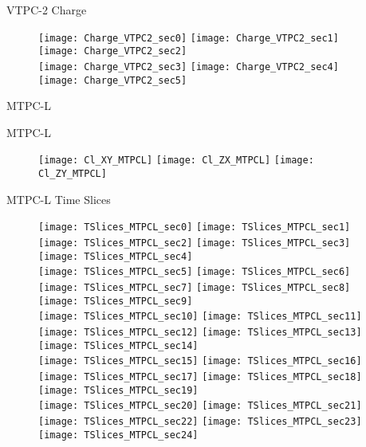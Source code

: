 \documentclass[11pt]{beamer}
\begin{document}
\begin{frame}{VTPC-2 Charge}
\begin{figure}
\centering
\texttt{[image: Charge\_VTPC2\_sec0]}
\texttt{[image: Charge\_VTPC2\_sec1]}
\texttt{[image: Charge\_VTPC2\_sec2]}\\
\texttt{[image: Charge\_VTPC2\_sec3]}
\texttt{[image: Charge\_VTPC2\_sec4]}
\texttt{[image: Charge\_VTPC2\_sec5]}
\end{figure}
\end{frame}

\begin{frame}
\centering
\Huge
MTPC-L
\end{frame}

\begin{frame}{MTPC-L}
\begin{figure}
\centering
\texttt{[image: Cl\_XY\_MTPCL]}
\texttt{[image: Cl\_ZX\_MTPCL]}
\texttt{[image: Cl\_ZY\_MTPCL]}
\end{figure}
\end{frame}

\begin{frame}{MTPC-L Time Slices}
\begin{figure}
\centering
\texttt{[image: TSlices\_MTPCL\_sec0]}
\texttt{[image: TSlices\_MTPCL\_sec1]}
\texttt{[image: TSlices\_MTPCL\_sec2]}
\texttt{[image: TSlices\_MTPCL\_sec3]}
\texttt{[image: TSlices\_MTPCL\_sec4]}\\
\texttt{[image: TSlices\_MTPCL\_sec5]}
\texttt{[image: TSlices\_MTPCL\_sec6]}
\texttt{[image: TSlices\_MTPCL\_sec7]}
\texttt{[image: TSlices\_MTPCL\_sec8]}
\texttt{[image: TSlices\_MTPCL\_sec9]}\\
\texttt{[image: TSlices\_MTPCL\_sec10]}
\texttt{[image: TSlices\_MTPCL\_sec11]}
\texttt{[image: TSlices\_MTPCL\_sec12]}
\texttt{[image: TSlices\_MTPCL\_sec13]}
\texttt{[image: TSlices\_MTPCL\_sec14]}\\
\texttt{[image: TSlices\_MTPCL\_sec15]}
\texttt{[image: TSlices\_MTPCL\_sec16]}
\texttt{[image: TSlices\_MTPCL\_sec17]}
\texttt{[image: TSlices\_MTPCL\_sec18]}
\texttt{[image: TSlices\_MTPCL\_sec19]}\\
\texttt{[image: TSlices\_MTPCL\_sec20]}
\texttt{[image: TSlices\_MTPCL\_sec21]}
\texttt{[image: TSlices\_MTPCL\_sec22]}
\texttt{[image: TSlices\_MTPCL\_sec23]}
\texttt{[image: TSlices\_MTPCL\_sec24]}
\end{figure}
\end{frame}
\end{document}
